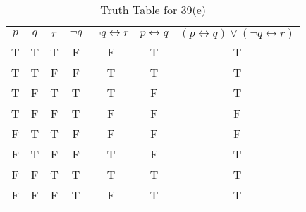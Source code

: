 \documentclass{Axon}
\begin{document}
\begin{table}[ht]
    \centering
    \begin{tabular}{c|c|c|c|c|c|c}
    \(p\) & \(q\) & \(r\) & \(\lnot q\) & \(\lnot q \leftrightarrow r\) & \(p \leftrightarrow q\) & \((p \leftrightarrow q) \lor (\lnot q \leftrightarrow r)\) \\
    T     & T     & T     & F           & F                             & T                       & T                                                          \\
    T     & T     & F     & F           & T                             & T                       & T                                                          \\
    T     & F     & T     & T           & T                             & F                       & T                                                          \\
    T     & F     & F     & T           & F                             & F                       & F                                                          \\
    F     & T     & T     & F           & F                             & F                       & F                                                          \\
    F     & T     & F     & F           & T                             & F                       & T                                                          \\
    F     & F     & T     & T           & T                             & T                       & T                                                          \\
    F     & F     & F     & T           & F                             & T                       & T
    \end{tabular}
    \caption{Truth Table for 39(e)}
\end{table}
\end{document}
